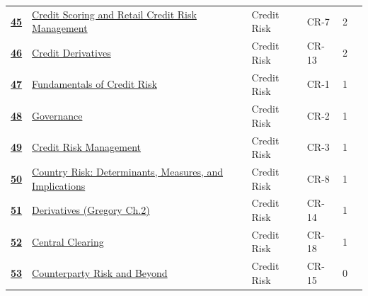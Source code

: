 \begin{longtable}{@{}r@{\hskip 7pt}L{6.35cm}@{\hskip 5pt}l@{\hskip 10pt}l@{\hskip 3pt}r@{\hskip 7pt}r@{}}
\hyperref[roi:45]{{\sffamily\bfseries\color{FRMGold}45}} & \hyperref[roi:45]{{\color{black}Credit Scoring and Retail Credit Risk Management}} & {\color{FRMGrey}Credit Risk} & {\color{FRMGrey}CR-7} & {\color{FRMGrey}2} & \hyperref[roi:45]{{\sffamily\bfseries\color{FRMNavy}\pageref{roi:45}}} \\
\hyperref[roi:46]{{\sffamily\bfseries\color{FRMGold}46}} & \hyperref[roi:46]{{\color{black}Credit Derivatives}} & {\color{FRMGrey}Credit Risk} & {\color{FRMGrey}CR-13} & {\color{FRMGrey}2} & \hyperref[roi:46]{{\sffamily\bfseries\color{FRMNavy}\pageref{roi:46}}} \\
\hyperref[roi:47]{{\sffamily\bfseries\color{FRMGold}47}} & \hyperref[roi:47]{{\color{black}Fundamentals of Credit Risk}} & {\color{FRMGrey}Credit Risk} & {\color{FRMGrey}CR-1} & {\color{FRMGrey}1} & \hyperref[roi:47]{{\sffamily\bfseries\color{FRMNavy}\pageref{roi:47}}} \\
\hyperref[roi:48]{{\sffamily\bfseries\color{FRMGold}48}} & \hyperref[roi:48]{{\color{black}Governance}} & {\color{FRMGrey}Credit Risk} & {\color{FRMGrey}CR-2} & {\color{FRMGrey}1} & \hyperref[roi:48]{{\sffamily\bfseries\color{FRMNavy}\pageref{roi:48}}} \\
\hyperref[roi:49]{{\sffamily\bfseries\color{FRMGold}49}} & \hyperref[roi:49]{{\color{black}Credit Risk Management}} & {\color{FRMGrey}Credit Risk} & {\color{FRMGrey}CR-3} & {\color{FRMGrey}1} & \hyperref[roi:49]{{\sffamily\bfseries\color{FRMNavy}\pageref{roi:49}}} \\
\hyperref[roi:50]{{\sffamily\bfseries\color{FRMGold}50}} & \hyperref[roi:50]{{\color{black}Country Risk: Determinants, Measures, and Implications}} & {\color{FRMGrey}Credit Risk} & {\color{FRMGrey}CR-8} & {\color{FRMGrey}1} & \hyperref[roi:50]{{\sffamily\bfseries\color{FRMNavy}\pageref{roi:50}}} \\
\hyperref[roi:51]{{\sffamily\bfseries\color{FRMGold}51}} & \hyperref[roi:51]{{\color{black}Derivatives (Gregory Ch.2)}} & {\color{FRMGrey}Credit Risk} & {\color{FRMGrey}CR-14} & {\color{FRMGrey}1} & \hyperref[roi:51]{{\sffamily\bfseries\color{FRMNavy}\pageref{roi:51}}} \\
\hyperref[roi:52]{{\sffamily\bfseries\color{FRMGold}52}} & \hyperref[roi:52]{{\color{black}Central Clearing}} & {\color{FRMGrey}Credit Risk} & {\color{FRMGrey}CR-18} & {\color{FRMGrey}1} & \hyperref[roi:52]{{\sffamily\bfseries\color{FRMNavy}\pageref{roi:52}}} \\
\hyperref[roi:53]{{\sffamily\bfseries\color{FRMGold}53}} & \hyperref[roi:53]{{\color{black}Counterparty Risk and Beyond}} & {\color{FRMGrey}Credit Risk} & {\color{FRMGrey}CR-15} & {\color{FRMGrey}0} & \hyperref[roi:53]{{\sffamily\bfseries\color{FRMNavy}\pageref{roi:53}}} \\

\end{longtable}
